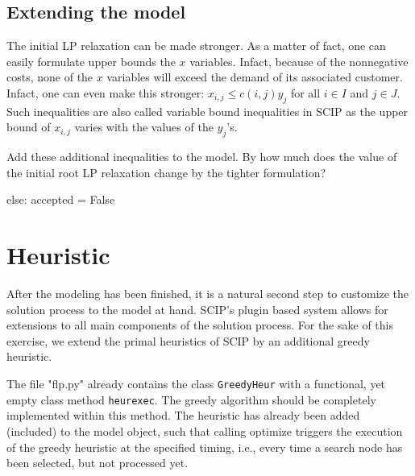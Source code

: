 \documentclass[a4paper,10pt]{article}
\begin{document}
\subsection{Extending the model}

The initial LP relaxation can be made stronger. As a matter of fact, one can easily formulate upper bounds the $x$ variables. Infact, because of the nonnegative costs, none of the $x$ variables will exceed the demand of its associated customer. Infact, one can even make this stronger: $x_{i,j} \leq c(i,j) y_{j}$ for all $i \in I$ and $j \in J$. Such inequalities are also called variable bound inequalities in SCIP as the upper bound of $x_{i,j}$ varies with the values of the $y_{j}$'s.

Add these additional inequalities to the model. By how much does the value of the initial root LP relaxation
change by the tighter formulation?

else:
            accepted = False

\section{Heuristic}

After the modeling has been finished, it is a natural second step to
customize the solution process to the model at hand.
SCIP's plugin based system allows for extensions to all main components
of the solution process.
For the sake of this exercise, we extend the primal heuristics of
SCIP by an additional greedy heuristic.

The file "flp.py" already contains the class
\texttt{GreedyHeur} with a functional, yet
empty class method \texttt{heurexec}.
The greedy algorithm should be completely implemented within this method.
The heuristic has already been added (included) to the model
object, such that calling optimize triggers the
execution of the greedy heuristic at the specified timing,
i.e., every time a search node has been selected, but not processed yet.
\end{document}
